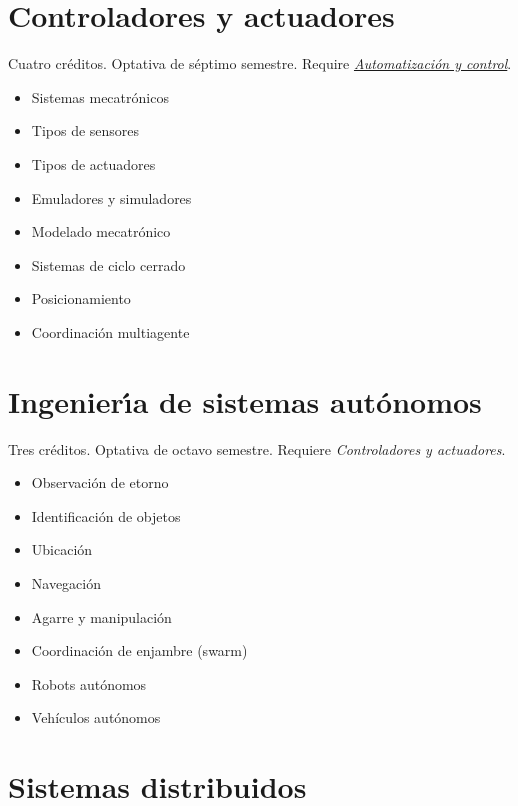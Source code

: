 \documentclass{article}
\begin{document}
\begin{multicols}{4}
\vfill\null \columnbreak


\hypertarget{cya}{\section*{Controladores y actuadores}} 

Cuatro cr\'{e}ditos. Optativa de s\'{e}ptimo semestre. Require
\hyperlink{ayc}{\em Automatizaci\'{o}n y control}.

\begin{itemize}
\item{Sistemas mecatr\'{o}nicos}
\item{Tipos de sensores}
\item{Tipos de actuadores}
\item{Emuladores y simuladores}  
\item{Modelado mecatr\'{o}nico}
\item{Sistemas de ciclo cerrado}
\item{Posicionamiento}
\item{Coordinaci\'{o}n multiagente}
\end{itemize}

\vfill\null \columnbreak

\hypertarget{idsa}{\section*{Ingenier\'{\i}a de sistemas aut\'{o}nomos}} Tres cr\'{e}ditos. Optativa de octavo
semestre. Requiere {\em Controladores y actuadores}.

\begin{itemize}
\item{Observaci\'{o}n de etorno}
\item{Identificaci\'{o}n de objetos}
\item{Ubicaci\'{o}n}
\item{Navegaci\'{o}n}
\item{Agarre y manipulaci\'{o}n}
\item{Coordinaci\'{o}n de enjambre (swarm)}
\item{Robots aut\'{o}nomos}
\item{Veh\'{i}culos aut\'{o}nomos}
\end{itemize}

\newpage

\hypertarget{sdi}{\section*{Sistemas distribuidos}} 


\end{multicols}
\end{document}
